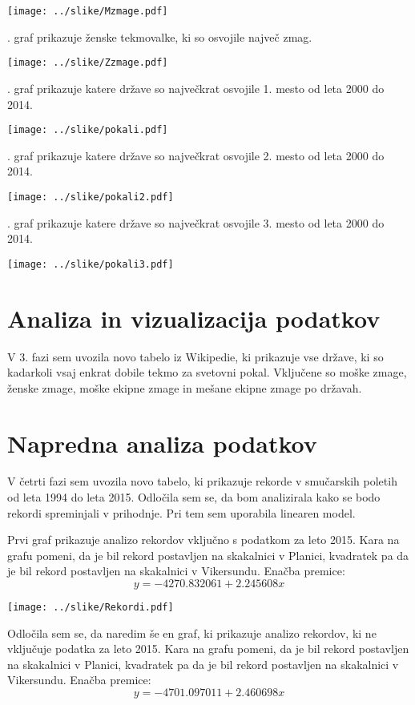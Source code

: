 \documentclass[11pt,a4paper]{article}
\begin{document}
\texttt{[image: ../slike/Mzmage.pdf]}

. graf prikazuje ženske tekmovalke, ki so osvojile največ zmag.

\texttt{[image: ../slike/Zzmage.pdf]}

. graf prikazuje katere države so največkrat osvojile 1. mesto od leta 2000 do 2014.

\texttt{[image: ../slike/pokali.pdf]}

. graf prikazuje katere države so največkrat osvojile 2. mesto od leta 2000 do 2014.

\texttt{[image: ../slike/pokali2.pdf]}

. graf prikazuje katere države so največkrat osvojile 3. mesto od leta 2000 do 2014.

\texttt{[image: ../slike/pokali3.pdf]}

\newpage
\section{Analiza in vizualizacija podatkov}
V 3. fazi sem uvozila novo tabelo iz Wikipedie, ki prikazuje vse države, ki so kadarkoli vsaj enkrat dobile tekmo za svetovni pokal. Vključene so moške zmage, ženske zmage, moške ekipne zmage in mešane ekipne zmage po državah.


\newpage
\section{Napredna analiza podatkov}
V četrti fazi sem uvozila novo tabelo, ki prikazuje rekorde v smučarskih poletih od leta 1994 do leta 2015. Odločila sem se, da bom analizirala kako se bodo rekordi spreminjali v prihodnje. Pri tem sem uporabila linearen model.

Prvi graf prikazuje analizo rekordov vključno s podatkom za leto 2015. Kara na grafu pomeni, da je bil rekord postavljen na skakalnici v Planici, kvadratek pa da je bil rekord postavljen na skakalnici v Vikersundu. Enačba premice: $$ y=-4270.832061 + 2.245608x$$

\texttt{[image: ../slike/Rekordi.pdf]}

Odločila sem se, da naredim še en graf, ki prikazuje analizo rekordov, ki ne vključuje podatka za leto 2015. Kara na grafu pomeni, da je bil rekord postavljen na skakalnici v Planici, kvadratek pa da je bil rekord postavljen na skakalnici v Vikersundu. Enačba premice: $$y=-4701.097011 + 2.460698x$$
\end{document}
